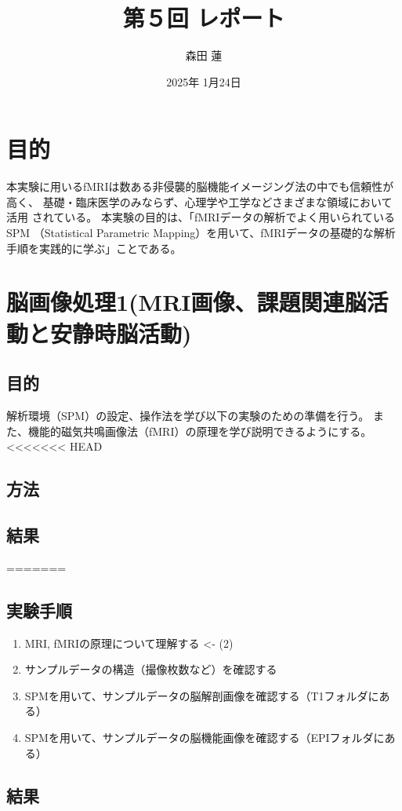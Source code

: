 \documentclass{jlreq}
\title{第５回 レポート}
\author{森田 蓮}
\date{2025年 1月24日}
\begin{document}
\maketitle

\section{目的}
本実験に用いるfMRIは数ある非侵襲的脳機能イメージング法の中でも信頼性が高く、
基礎・臨床医学のみならず、心理学や工学などさまざまな領域において活用
されている。
本実験の目的は、「fMRIデータの解析でよく用いられているSPM
（Statistical Parametric Mapping）を用いて、fMRIデータの基礎的な解析
手順を実践的に学ぶ」ことである。

\section{脳画像処理1(MRI画像、課題関連脳活動と安静時脳活動)}
\subsection{目的}
解析環境（SPM）の設定、操作法を学び以下の実験のための準備を行う。
また、機能的磁気共鳴画像法（fMRI）の原理を学び説明できるようにする。
<<<<<<< HEAD
\subsection{方法}

\subsection{結果}

=======
\subsection{実験手順}
\begin{enumerate}
    \item MRI, fMRIの原理について理解する <- (2)
    \item サンプルデータの構造（撮像枚数など）を確認する
    \item SPMを用いて、サンプルデータの脳解剖画像を確認する（T1フォルダにある）
    \item SPMを用いて、サンプルデータの脳機能画像を確認する（EPIフォルダにある）
\end{enumerate}
\subsection{結果}
\end{document}
